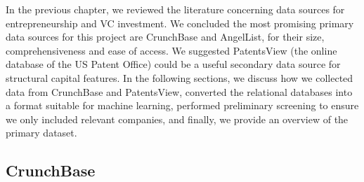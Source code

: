 \documentclass[../thesis/thesis.tex]{subfiles}
\begin{document}
In the previous chapter, we reviewed the literature concerning data sources for entrepreneurship and VC investment. We concluded the most promising primary data sources for this project are CrunchBase and AngelList, for their size, comprehensiveness and ease of access. We suggested PatentsView (the online database of the US Patent Office) could be a useful secondary data source for structural capital features. In the following sections, we discuss how we collected data from CrunchBase and PatentsView, converted the relational databases into a format suitable for machine learning, performed preliminary screening to ensure we only included relevant companies, and finally, we provide an overview of the primary dataset.

\subsection{CrunchBase}
\end{document}

